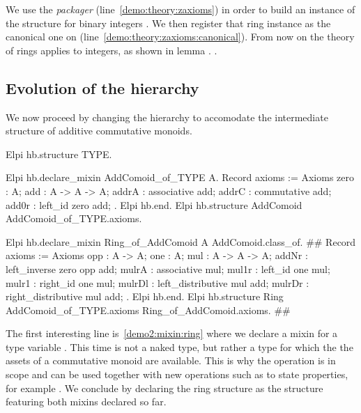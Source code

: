 \documentclass[a4paper,UKenglish,cleveref, autoref]{lipics-v2019}
\begin{document}
We use the  \emph{packager} (line~\ref{demo:theory:zaxioms})
in order to build an instance of the  structure for binary integers .
We then register that ring instance as the canonical one on 
(line~\ref{demo:theory:zaxioms:canonical}).
From now on the theory of rings applies to
integers, as shown in lemma .
.

\subsection{Evolution of the hierarchy}

We now proceed by changing the hierarchy to accomodate the intermediate
structure  of additive commutative monoids.

\begin{coqcode}
Elpi hb.structure TYPE.

Elpi hb.declare_mixin AddComoid_of_TYPE A.
  Record axioms := Axioms {
    zero : A;
    add : A -> A -> A;
    addrA : associative add;
    addrC : commutative add;
    add0r : left_id zero add;
  }.
Elpi hb.end.
Elpi hb.structure AddComoid AddComoid_of_TYPE.axioms.

Elpi hb.declare_mixin Ring_of_AddComoid A AddComoid.class_of. #\label{demo2:mixin:ring}#
  Record axioms := Axioms {
    opp : A -> A;
    one : A;
    mul : A -> A -> A;
    addNr : left_inverse zero opp add;
    mulrA : associative mul;
    mul1r : left_id one mul;
    mulr1 : right_id one mul;
    mulrDl : left_distributive mul add;
    mulrDr : right_distributive mul add;
  }.
Elpi hb.end.
Elpi hb.structure Ring AddComoid_of_TYPE.axioms Ring_of_AddComoid.axioms. #\label{demo2:structure:ring}#
\end{coqcode}

The first interesting line is~\ref{demo2:mixin:ring} where we declare a mixin
for a type variable . This time  is not a naked type, but rather
a type for which the the assets of a commutative monoid are available.
This is why the operation  is in scope and can be used
together with new operations such as  to state properties, for
example .
We conclude by declaring the ring structure as the structure featuring both
mixins declared so far.
\end{document}
